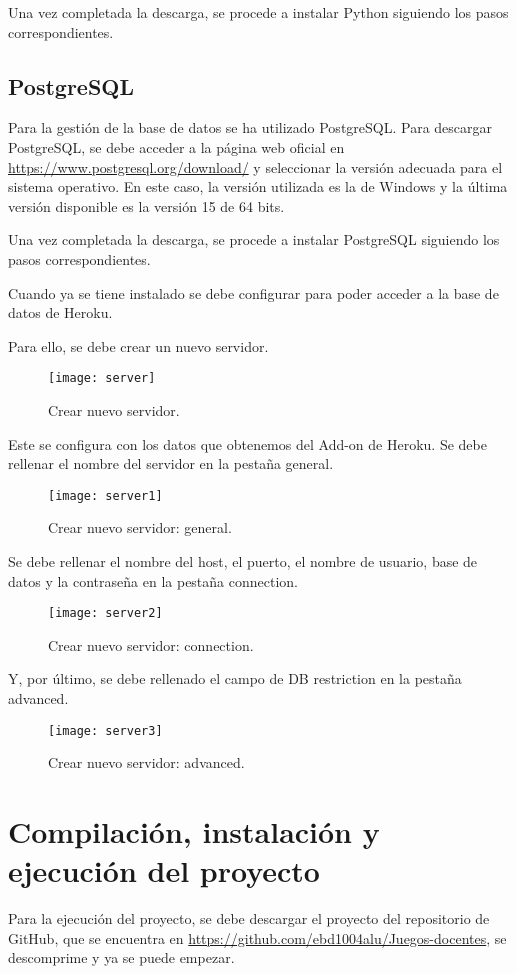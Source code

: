 Una vez completada la descarga, se procede a instalar Python siguiendo los pasos correspondientes.

\subsection{PostgreSQL}
Para la gestión de la base de datos se ha utilizado PostgreSQL. Para descargar PostgreSQL, se debe acceder a la página web oficial en \url{https://www.postgresql.org/download/} y seleccionar la versión adecuada para el sistema operativo. En este caso, la versión utilizada es la de Windows y la última versión disponible es la versión 15 de 64 bits.

Una vez completada la descarga, se procede a instalar PostgreSQL siguiendo los pasos correspondientes.

Cuando ya se tiene instalado se debe configurar para poder acceder a la base de datos de Heroku. 

Para ello, se debe crear un nuevo servidor.
    \begin{figure}[htbp]
    \centering
    \texttt{[image: server]}
    \caption{Crear nuevo servidor.}
    \label{fig:server}
    \end{figure}

Este se configura con los datos que obtenemos del Add-on de Heroku. Se debe rellenar el nombre del servidor en la pestaña general.
\newpage
    \begin{figure}[htbp]
    \centering
    \texttt{[image: server1]}
    \caption{Crear nuevo servidor: general.}
    \label{fig:server1}
    \end{figure}
    
Se debe rellenar el nombre del host, el puerto, el nombre de usuario, base de datos y la contraseña en la pestaña connection.
    \begin{figure}[htbp]
    \centering
    \texttt{[image: server2]}
    \caption{Crear nuevo servidor: connection.}
    \label{fig:server2}
    \end{figure}
    
Y, por último, se debe rellenado el campo de DB restriction en la pestaña advanced.
\newpage
    \begin{figure}[htbp]
    \centering
    \texttt{[image: server3]}
    \caption{Crear nuevo servidor: advanced.}
    \label{fig:server3}
    \end{figure}

\section{Compilación, instalación y ejecución del proyecto}
Para la ejecución del proyecto, se debe descargar el proyecto del repositorio de
GitHub, que se encuentra en  \url{https://github.com/ebd1004alu/Juegos-docentes},
se descomprime y ya se puede empezar.

